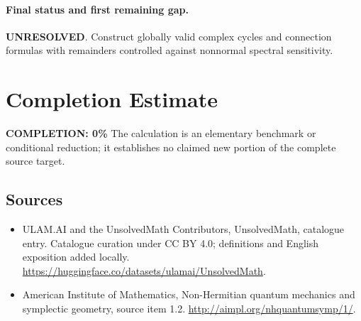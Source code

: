 \documentclass[11pt]{article}
\begin{document}
\paragraph{Final status and first remaining gap.}
\textbf{UNRESOLVED}. Construct globally valid complex cycles and connection formulas with remainders controlled against nonnormal spectral sensitivity.

\section{Completion Estimate}
\noindent\textbf{COMPLETION: 0\%}
The calculation is an elementary benchmark or conditional reduction; it establishes no claimed new portion of the complete source target.

\subsection{Sources}
\begin{itemize}
\item[\hypertarget{source:statement:1}{S1}] ULAM.AI and the UnsolvedMath Contributors, UnsolvedMath, catalogue entry. Catalogue curation under CC BY 4.0; definitions and English exposition added locally.
\url{https://huggingface.co/datasets/ulamai/UnsolvedMath}.
\item[\hypertarget{source:statement:2}{S2}] American Institute of Mathematics, Non-Hermitian quantum mechanics and symplectic geometry, source item 1.2.
\url{http://aimpl.org/nhquantumsymp/1/}.
\end{itemize}
\label{end:statement}
\end{document}
